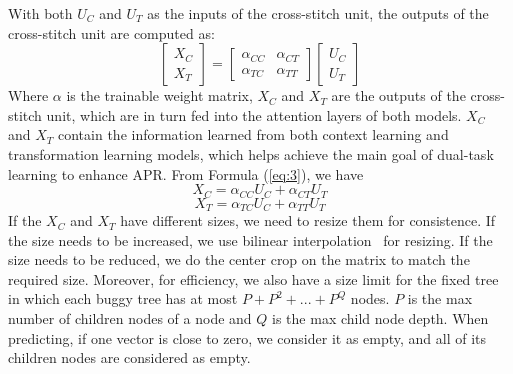 With both $U_C$ and $U_T$ as the inputs of the cross-stitch unit, the
outputs of the cross-stitch unit are computed as:
\begin{equation}\label{eq:3}
	\begin{bmatrix}
		X_C\\
		X_T
	\end{bmatrix}
	=
	\begin{bmatrix}
		\alpha_{CC} &  \alpha_{CT} \\
		\alpha_{TC} &  \alpha_{TT}
	\end{bmatrix}
	\begin{bmatrix}
		U_C\\
		U_T
	\end{bmatrix}
\end{equation}
Where $\alpha$ is the trainable weight matrix, $X_C$ and $X_T$ are the
outputs of the cross-stitch unit, which are in turn fed into the
attention layers of both models. $X_C$ and $X_T$ contain the
information learned from both context learning and transformation
learning models, which helps achieve the main goal of dual-task learning
to enhance APR. From Formula (\ref{eq:3}), we have
\begin{equation}\label{eq:4}
	X_C = \alpha_{CC}U_C + \alpha_{CT}U_T
\end{equation}
\begin{equation}\label{eq:5}
	X_T = \alpha_{TC}U_C + \alpha_{TT}U_T
\end{equation}
If the $X_C$ and $X_T$ have different sizes, we need to resize them
for consistence. If the size needs to be increased, we use bilinear
interpolation~\cite{bilinear-interpolation} for resizing. If the size
needs to be reduced, we do the center crop on the matrix to match the
required size. Moreover, for efficiency, we also have a size limit for
the fixed tree in which each buggy tree has at most $P+P^2+...+P^Q$
nodes.  $P$ is the max number of children nodes of a node and $Q$ is
the max child node depth. When predicting, if one vector is close
to zero, we consider it as empty, and all of its children nodes are
considered as empty.



